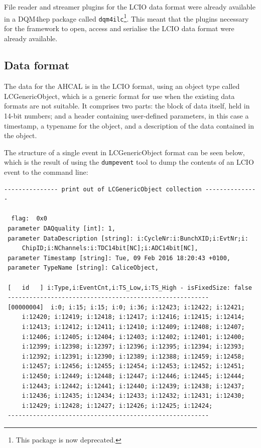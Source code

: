 File reader and streamer plugins for the \acrshort{LCIO} data format were already available in a DQM4hep package called \texttt{dqm4ilc}\footnote{This package is now deprecated.}. This meant that the plugins necessary for the framework to open, access and serialise the \acrshort{LCIO} data format were already available. 

\subsection{Data format}
The data for the \acrshort{AHCAL} is in the \acrfull{LCIO} format, using an object type called LCGenericObject, which is a generic format for use when the existing data formats are not suitable. It comprises two parts: the block of data itself, held in 14-bit numbers; and a header containing user-defined parameters, in this case a timestamp, a typename for the object, and a description of the data contained in the object.

The structure of a single event in LCGenericObject format can be seen below, which is the result of using the \texttt{dumpevent} tool to dump the contents of an \acrshort{LCIO} event to the command line:

\begin{verbatim}
--------------- print out of LCGenericObject collection --------------- 

  flag:  0x0
 parameter DAQquality [int]: 1, 
 parameter DataDescription [string]: i:CycleNr:i:BunchXID;i:EvtNr;i:
     ChipID;i:NChannels:i:TDC14bit[NC];i:ADC14bit[NC],
 parameter Timestamp [string]: Tue, 09 Feb 2016 18:20:43 +0100,
 parameter TypeName [string]: CaliceObject,

 [   id   ] i:Type,i:EventCnt,i:TS_Low,i:TS_High - isFixedSize: false
 --------------------------------------------------------
 [00000004]  i:0; i:15; i:15; i:0; i:36; i:12423; i:12422; i:12421;
     i:12420; i:12419; i:12418; i:12417; i:12416; i:12415; i:12414;
     i:12413; i:12412; i:12411; i:12410; i:12409; i:12408; i:12407;
     i:12406; i:12405; i:12404; i:12403; i:12402; i:12401; i:12400;
     i:12399; i:12398; i:12397; i:12396; i:12395; i:12394; i:12393;
     i:12392; i:12391; i:12390; i:12389; i:12388; i:12459; i:12458;
     i:12457; i:12456; i:12455; i:12454; i:12453; i:12452; i:12451;
     i:12450; i:12449; i:12448; i:12447; i:12446; i:12445; i:12444;
     i:12443; i:12442; i:12441; i:12440; i:12439; i:12438; i:12437;
     i:12436; i:12435; i:12434; i:12433; i:12432; i:12431; i:12430;
     i:12429; i:12428; i:12427; i:12426; i:12425; i:12424;
 --------------------------------------------------------
\end{verbatim}

